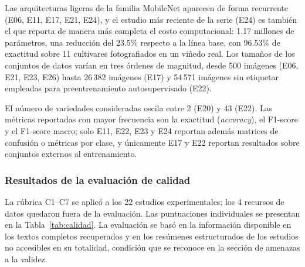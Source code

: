 Las arquitecturas ligeras de la familia MobileNet aparecen de forma recurrente
(E06, E11, E17, E21, E24), y el estudio más reciente de la serie (E24) es
también el que reporta de manera más completa el costo computacional: 1.17
millones de parámetros, una reducción del 23.5\% respecto a la línea base, con
96.53\% de exactitud sobre 11 cultivares fotografiados en un viñedo real. Los
tamaños de los conjuntos de datos varían en tres órdenes de magnitud, desde
500 imágenes (E06, E21, E23, E26) hasta 26\,382 imágenes (E17) y 54\,571
imágenes sin etiquetar empleadas para preentrenamiento autosupervisado (E22).

El número de variedades consideradas oscila entre 2 (E20) y 43 (E22). Las
métricas reportadas con mayor frecuencia son la exactitud
(\textit{accuracy}), el F1-score y el F1-score macro; solo E11, E22, E23 y
E24 reportan además matrices de confusión o métricas por clase, y únicamente
E17 y E22 reportan resultados sobre conjuntos externos al entrenamiento.

\subsubsection{Resultados de la evaluación de calidad}

La rúbrica C1--C7 se aplicó a los 22 estudios experimentales; los 4 recursos
de datos quedaron fuera de la evaluación. Las puntuaciones individuales se
presentan en la Tabla~\ref{tab:calidad}. La evaluación se basó en la
información disponible en los textos completos recuperados y en los resúmenes
estructurados de los estudios no accesibles en su totalidad, condición que se
reconoce en la sección de amenazas a la validez.

